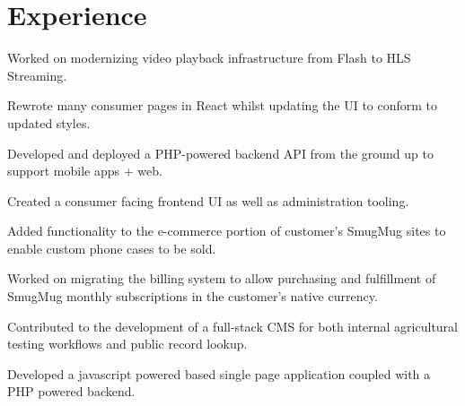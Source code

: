 \documentclass[]{resume-openfont}
\begin{document}
\begin{minipage}[t]{0.7\textwidth} 


\section{Experience}

\vspace{\topsep} %
\begin{tightemize}
\item Worked on modernizing video playback infrastructure from Flash to HLS Streaming.
\item Rewrote many consumer pages in React whilst updating the UI to conform to updated styles.
\end{tightemize}
\sectionsep

\begin{tightemize}
\item Developed and deployed a PHP-powered backend API from the ground up to support mobile apps + web.
\item Created a consumer facing frontend UI as well as administration tooling.
\end{tightemize}
\sectionsep

\begin{tightemize}
\item Added functionality to the e-commerce portion of customer’s SmugMug sites to enable custom phone cases to be sold.
\item Worked on migrating the billing system to allow purchasing and fulfillment of SmugMug monthly subscriptions in the customer's native currency.
\end{tightemize}
\sectionsep

\begin{tightemize}
\item Contributed to the development of a full-stack CMS for both internal agricultural testing workflows and public record lookup.
\item Developed a javascript powered based single page application coupled with a PHP powered backend.
\end{tightemize}
\sectionsep


\end{minipage}
\end{document}
